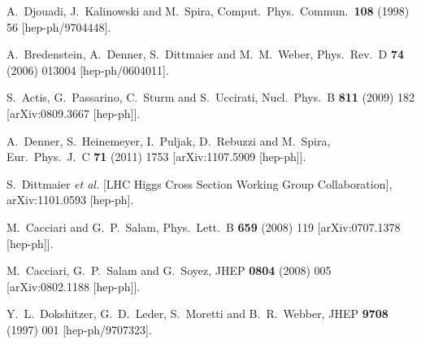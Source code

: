 \documentclass[preprintnumbers,superscriptaddress,nofootinbib,aps,prd,floatfix]{revtex4}
\begin{document}
\begin{thebibliography}{99}
  A.~Djouadi, J.~Kalinowski and M.~Spira,
  Comput.\ Phys.\ Commun.\  {\bf 108} (1998) 56
  [hep-ph/9704448].
  
  A.~Bredenstein, A.~Denner, S.~Dittmaier and M.~M.~Weber,
  Phys.\ Rev.\ D {\bf 74} (2006) 013004
  [hep-ph/0604011].
  
  S.~Actis, G.~Passarino, C.~Sturm and S.~Uccirati,
  Nucl.\ Phys.\ B {\bf 811} (2009) 182
  [arXiv:0809.3667 [hep-ph]].
  
  A.~Denner, S.~Heinemeyer, I.~Puljak, D.~Rebuzzi and M.~Spira,
  Eur.\ Phys.\ J.\ C {\bf 71} (2011) 1753
  [arXiv:1107.5909 [hep-ph]].
  
  S.~Dittmaier {\it et al.}  [LHC Higgs Cross Section Working Group Collaboration],
  arXiv:1101.0593 [hep-ph].

  M.~Cacciari and G.~P.~Salam,
  Phys.\ Lett.\ B {\bf 659} (2008) 119
  [arXiv:0707.1378 [hep-ph]].

  M.~Cacciari, G.~P.~Salam and G.~Soyez,
  JHEP {\bf 0804} (2008) 005
  [arXiv:0802.1188 [hep-ph]].
  
  Y.~L.~Dokshitzer, G.~D.~Leder, S.~Moretti and B.~R.~Webber,
  JHEP {\bf 9708} (1997) 001
  [hep-ph/9707323].
  

\end{thebibliography}
\end{document}
